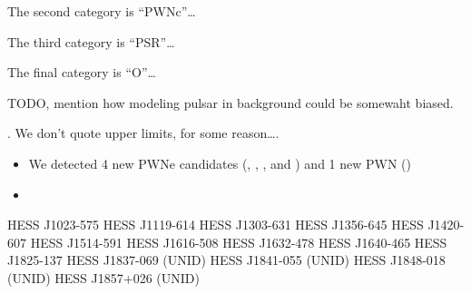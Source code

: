 The second category is ``PWNc''\ldots

The third category is ``PSR''\ldots

The final category is ``O''\ldots

TODO, mention how modeling pulsar in background could be somewaht biased.

. We don't quote upper limits, for some reason\ldots.




\begin{itemize}
  \item
    We detected 4 new PWNe candidates (, ,
    ,
    and )
    and 1 new PWN ()
  \item
\end{itemize}



HESS J1023-575
HESS J1119-614
HESS J1303-631
HESS J1356-645
HESS J1420-607
HESS J1514-591
HESS J1616-508
HESS J1632-478
HESS J1640-465
HESS J1825-137
HESS J1837-069 (UNID)
HESS J1841-055 (UNID)
HESS J1848-018 (UNID)
HESS J1857+026 (UNID)



